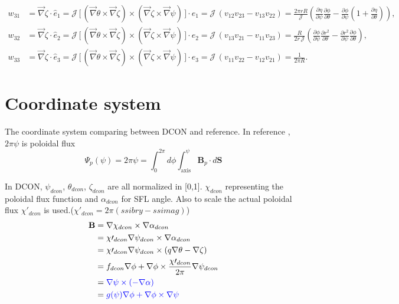 \documentclass[10pt,a4paper]{article}
\numberwithin{equation}{section}
\begin{document}
\begin{equation}
    \begin{aligned}
    w_{31}
    &= \vec\nabla\zeta \cdot \hat e_1
    = \mathcal{J}\,\Big[\,(\vec\nabla\theta \times \vec\nabla\zeta)\times(\vec\nabla\zeta \times \vec\nabla\psi)\,\Big]\!\cdot\hat e_1
    = \mathcal{J}\,(v_{12}v_{23}-v_{13}v_{22})
    = \frac{2\pi r R}{\mathcal{J}}\!\left(
        \frac{\partial \eta}{\partial \psi}\frac{\partial \phi}{\partial \theta}
    - \frac{\partial \phi}{\partial \psi}\left(1+\frac{\partial \eta}{\partial \theta}\right)
    \right), \\[6pt]
    w_{32}
    &= \vec\nabla\zeta \cdot \hat e_2
    = \mathcal{J}\,\Big[\,(\vec\nabla\theta \times \vec\nabla\zeta)\times(\vec\nabla\zeta \times \vec\nabla\psi)\,\Big]\!\cdot\hat e_2
    = \mathcal{J}\,(v_{13}v_{21}-v_{11}v_{23})
    = \frac{R}{2r\,\mathcal{J}}\!\left(
        \frac{\partial \phi}{\partial \psi}\frac{\partial r^{2}}{\partial \theta}
    - \frac{\partial r^{2}}{\partial \psi}\frac{\partial \phi}{\partial \theta}
    \right), \\[6pt]
    w_{33}
    &= \vec\nabla\zeta \cdot \hat e_3
    = \mathcal{J}\,\Big[\,(\vec\nabla\theta \times \vec\nabla\zeta)\times(\vec\nabla\zeta \times \vec\nabla\psi)\,\Big]\!\cdot\hat e_3
    = \mathcal{J}\,(v_{11}v_{22}-v_{12}v_{21})
    = \frac{1}{2\pi R}.
    \end{aligned}
\end{equation}

\section{Coordinate system}

The coordinate system comparing between DCON and reference\cite{chance1992mhd}.
In reference \cite{chance1992mhd}, $2 \pi \psi$ is poloidal flux 
\begin{equation}
\Psi_p(\psi) = 2\pi \psi 
= \int_{0}^{2\pi} d\phi 
  \int_{\text{axis}}^{\psi} 
  \mathbf{B}_p \cdot d\mathbf{S}
\end{equation}

\color{red}In DCON, $\psi_{dcon}$, $\theta_{dcon}$, $\zeta_{dcon}$ are all normalized in [0,1]. $\chi_{dcon}$ representing the poloidal flux function and $\alpha_{dcon}$ for SFL angle. Also to scale the actual poloidal flux $\chi\prime_{dcon}$ is used.($\chi\prime_{dcon} = 2\pi(ssibry-ssimag)$)
\color{black}\begin{align}
\mathbf{B} &= \nabla \chi_{dcon} \times \nabla \alpha_{dcon}\\
%
&= \chi\prime_{dcon} \nabla \psi_{dcon} \times \nabla \alpha_{dcon}\\
%
&= \chi\prime_{dcon} \nabla \psi_{dcon} \times (q\nabla \theta - \nabla \zeta)\\
%
&= f_{dcon} \nabla \phi + \nabla \phi \times \frac{\chi\prime_{dcon}}{2\pi} \nabla \psi_{dcon} \\
%
&= \color{blue} \nabla \psi \times (- \nabla \alpha)\\
%
&= \color{blue} g(\psi) \nabla \phi + \nabla \phi \times \nabla \psi 
\end{align}
\end{document}
